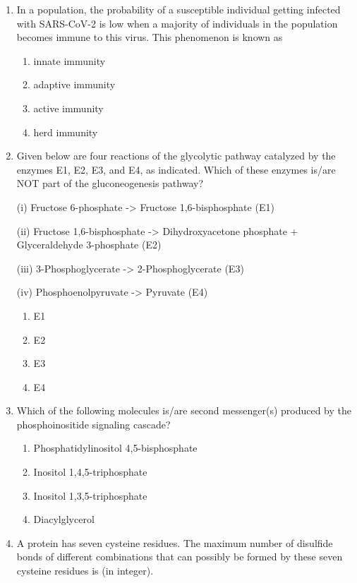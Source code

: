 \documentclass[journal,12pt,onecolumn]{IEEEtran}
\begin{document}
\begin{enumerate}
    \item In a population, the probability of a susceptible individual getting infected with SARS-CoV-2 is low when a majority of individuals in the population becomes immune to this virus. This phenomenon is known as
    \begin{enumerate}
        \item innate immunity
        \item adaptive immunity
        \item active immunity
        \item herd immunity
    \end{enumerate}

    \item Given below are four reactions of the glycolytic pathway catalyzed by the enzymes E1, E2, E3, and E4, as indicated. Which of these enzymes is/are NOT part of the gluconeogenesis pathway?
    
    (i) Fructose 6-phosphate -> Fructose 1,6-bisphosphate (E1)
    
    (ii) Fructose 1,6-bisphosphate -> Dihydroxyacetone phosphate + Glyceraldehyde 3-phosphate (E2)
    
    (iii) 3-Phosphoglycerate -> 2-Phosphoglycerate (E3)
    
    (iv) Phosphoenolpyruvate -> Pyruvate (E4)
    \begin{enumerate}
        \item E1
        \item E2
        \item E3
        \item E4
    \end{enumerate}

    \item Which of the following molecules is/are second messenger(s) produced by the phosphoinositide signaling cascade?
    \begin{enumerate}
        \item Phosphatidylinositol 4,5-bisphosphate
        \item Inositol 1,4,5-triphosphate
        \item Inositol 1,3,5-triphosphate
        \item Diacylglycerol
    \end{enumerate}

    \item A protein has seven cysteine residues. The maximum number of disulfide bonds of different combinations that can possibly be formed by these seven cysteine residues is (in integer).


\end{enumerate}
\end{document}
